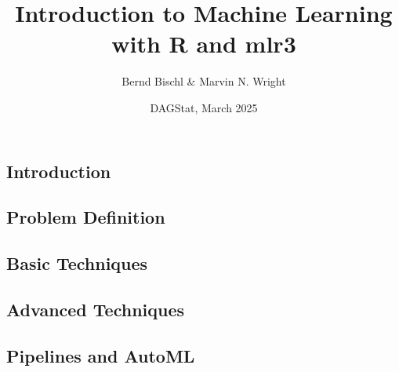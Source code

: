 \documentclass[13pt,compress]{beamer}
\title{Introduction to Machine Learning\\with R and mlr3}
\author{Bernd Bischl \& Marvin N. Wright}
\date{DAGStat, March 2025}
\begin{document}


\frame{\titlepage}


\subsection{Introduction}


\subsection{Problem Definition}


\subsection{Basic Techniques}


\subsection{Advanced Techniques}


\subsection{Pipelines and AutoML}

\end{document}
